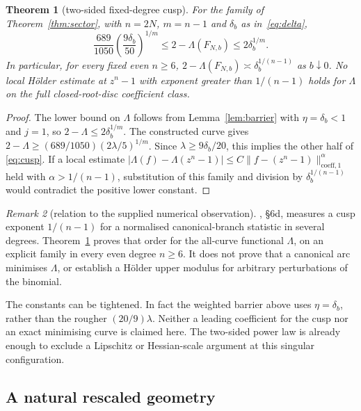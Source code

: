 \documentclass[11pt,a4paper]{article}
\newtheorem{theorem}{Theorem}[section]
\theoremstyle{remark}\newtheorem{remark}[theorem]{Remark}
\begin{document}
\begin{theorem}[two-sided fixed-degree cusp]\label{thm:cusp}
For the family of Theorem~\ref{thm:sector}, with $n=2N$, $m=n-1$ and
$\delta_b$ as in~\eqref{eq:delta},
\begin{equation}\label{eq:cusp}
 \boxed{
 \frac{689}{1050}\left(\frac{9\delta_b}{50}\right)^{1/m}
 \le 2-\Lambda(F_{N,b})
 \le 2\delta_b^{1/m}.}
\end{equation}
In particular, for every fixed even $n\ge6$,
$2-\Lambda(F_{N,b})\asymp\delta_b^{1/(n-1)}$ as $b\downarrow0$.
No local H\"older estimate at $z^n-1$ with exponent greater than
$1/(n-1)$ holds for $\Lambda$ on the full closed-root-disc coefficient class.
\end{theorem}
\begin{proof}
The lower bound on $\Lambda$ follows from Lemma~\ref{lem:barrier} with
$\eta=\delta_b<1$ and $j=1$, so $2-\Lambda\le2\delta_b^{1/m}$.
The constructed curve gives
$2-\Lambda\ge(689/1050)(2\lambda/5)^{1/m}$.
Since $\lambda\ge9\delta_b/20$, this implies the other half of
\eqref{eq:cusp}. If a local estimate
$|\Lambda(f)-\Lambda(z^n-1)|\le C\|f-(z^n-1)\|_{\mathrm{coeff},1}^{\alpha}$
held with $\alpha>1/(n-1)$, substitution of this family and division by
$\delta_b^{1/(n-1)}$ would contradict the positive lower constant.
\end{proof}

\begin{remark}[relation to the supplied numerical observation]
, \S6d, measures a cusp exponent
$1/(n-1)$ for a normalised canonical-branch statistic in several degrees.
Theorem~\ref{thm:cusp} proves that order for the all-curve functional
$\Lambda$, on an explicit family in every even degree $n\ge6$.
It does not prove that a canonical arc minimises $\Lambda$, or establish a
H\"older upper modulus for arbitrary perturbations of the binomial.
\end{remark}

The constants can be tightened. In fact the weighted barrier above uses
$\eta=\delta_b$, rather than the rougher $(20/9)\lambda$.
Neither a leading coefficient for the cusp nor an exact minimising curve is
claimed here. The two-sided power law is already enough to exclude a
Lipschitz or Hessian-scale argument at this singular configuration.

\subsection{A natural rescaled geometry}
\end{document}
